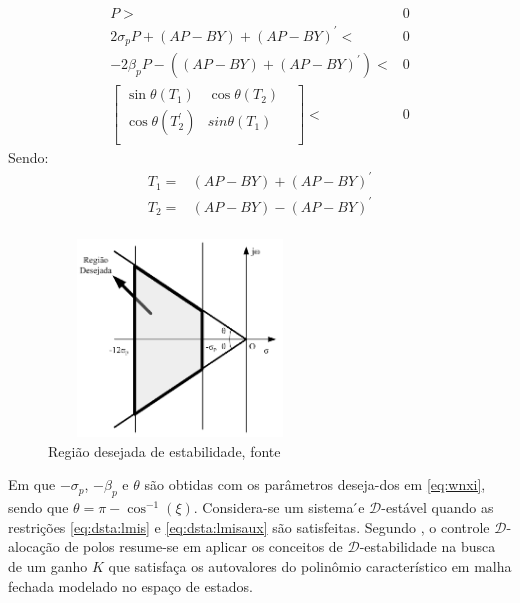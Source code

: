 \begin{equation}\label{eq:dsta:lmis}
  \begin{split}
    P>&0\\
     2\sigma_pP+(AP-BY)+(AP-BY)^'<&0\\
    -2\beta_pP-((AP-BY)+(AP-BY)^')<&0\\
    \begin{bmatrix}
      \sin{\theta}(T_1)&\cos{\theta}(T_2)&\\
      \cos{\theta}(T^'_2)&sin{\theta}(T_1)&\\
    \end{bmatrix}<&0
  \end{split}  
\end{equation}
Sendo:
\begin{equation}\label{eq:dsta:lmisaux}
  \begin{split}
    T_1=&(AP-BY)+(AP-BY)^'\\
    T_2=&(AP-BY)-(AP-BY)^'\\
  \end{split} 
\end{equation}

\FloatBarrier
\begin{figure}[htbp] 
  \begin{centering}
    \includegraphics[width=7cm,height=5.25cm]{img/regiao_destabilidade.png}
    \caption{Região desejada de estabilidade, fonte \cite{CostaControleEolica}}
    \label{eq:dsta:regiao}
  \end{centering}
\end{figure}
\FloatBarrier

Em que $-\sigma_p$, $-\beta_p$ e $\theta$ são obtidas com os parâmetros deseja-dos em \eqref{eq:wnxi}, sendo que $\theta=\pi-\cos^{-1}(\xi)$. Considera-se um sistema ́e \( \mathcal{D}\)-estável quando as restrições \eqref{eq:dsta:lmis} e \eqref{eq:dsta:lmisaux} são satisfeitas. Segundo \cite{AguirreEncic}, o controle \( \mathcal{D}\)-alocação de polos resume-se em aplicar os conceitos de \( \mathcal{D}\)-estabilidade na busca de um ganho $K$ que satisfaça os autovalores do polinômio característico em malha fechada modelado no espaço de estados.